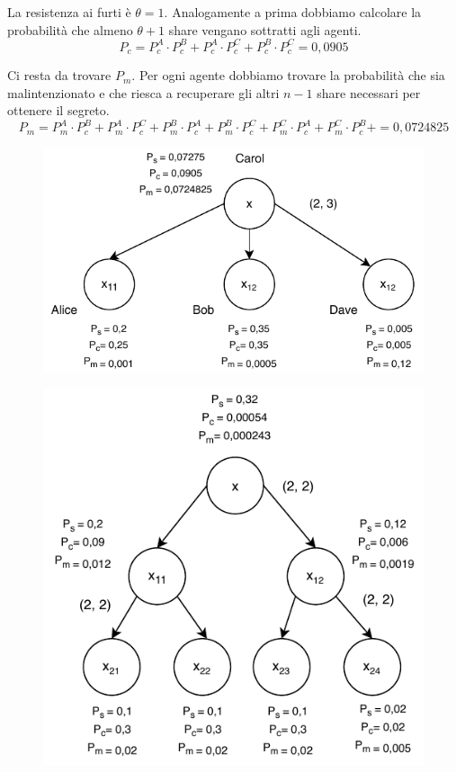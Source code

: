 La resistenza ai furti è $ \theta = 1 $. Analogamente a prima dobbiamo calcolare la probabilità che
almeno $ \theta + 1 $ share vengano sottratti agli agenti.
$$ P_c = P_c^A \cdot P_c^B + P_c^A \cdot P_c^C + P_c^B \cdot P_c^C = 0,0905 $$

Ci resta da trovare $ P_m $. Per ogni agente dobbiamo trovare la probabilità che sia malintenzionato e che riesca
a recuperare gli altri $ n - 1 $ share necessari per ottenere il segreto.
$$ P_m =
	P_m^A \cdot P_c^B + P_m^A \cdot P_c^C +
	P_m^B \cdot P_c^A + P_m^B \cdot P_c^C +
	P_m^C \cdot P_c^A + P_m^C \cdot P_c^B +
	= 0,0724825 $$

\begin{figure}[H]
	\centering
	\includegraphics[width=0.75\linewidth]{images/chap_analisi_robustezza/robustezza-1.pdf}
\end{figure}

\begin{figure}[H]
	\centering
	\includegraphics[width=0.6\linewidth]{images/chap_analisi_robustezza/robustezza-2-1.pdf}
\end{figure}

